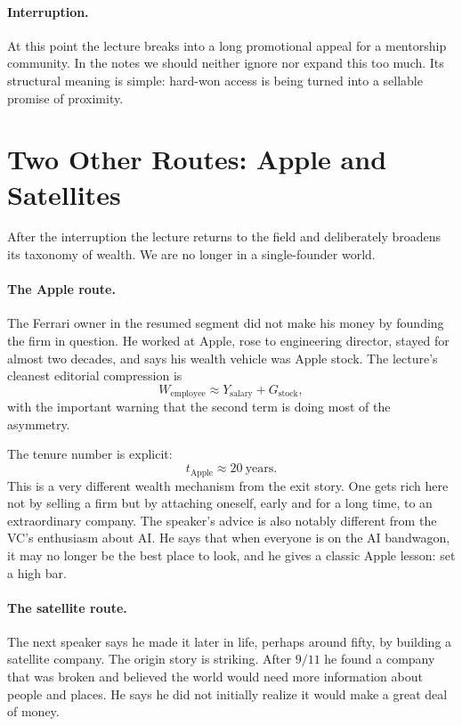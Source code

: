 \paragraph{Interruption.} At this point the lecture breaks into a long promotional appeal for a mentorship community. In the notes we should neither ignore nor expand this too much. Its structural meaning is simple: hard-won access is being turned into a sellable promise of proximity.

\section{Two Other Routes: Apple and Satellites}

After the interruption the lecture returns to the field and deliberately broadens its taxonomy of wealth. We are no longer in a single-founder world.

\paragraph{The Apple route.} The Ferrari owner in the resumed segment did not make his money by founding the firm in question. He worked at Apple, rose to engineering director, stayed for almost two decades, and says his wealth vehicle was Apple stock. The lecture's cleanest editorial compression is
\begin{equation}
W_{\text{employee}} \approx Y_{\text{salary}} + G_{\text{stock}},
\end{equation}
with the important warning that the second term is doing most of the asymmetry.

The tenure number is explicit:
\begin{equation}
t_{\text{Apple}} \approx 20 \ \text{years}.
\end{equation}
This is a very different wealth mechanism from the exit story. One gets rich here not by selling a firm but by attaching oneself, early and for a long time, to an extraordinary company. The speaker's advice is also notably different from the VC's enthusiasm about AI. He says that when everyone is on the AI bandwagon, it may no longer be the best place to look, and he gives a classic Apple lesson: set a high bar.

\paragraph{The satellite route.} The next speaker says he made it later in life, perhaps around fifty, by building a satellite company. The origin story is striking. After \(9/11\) he found a company that was broken and believed the world would need more information about people and places. He says he did not initially realize it would make a great deal of money.

